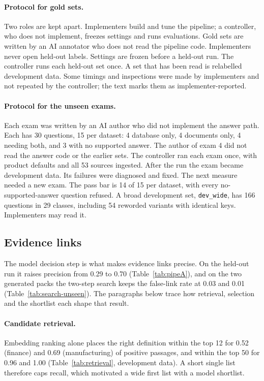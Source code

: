 \documentclass[11pt,a4paper]{article}
\begin{document}
\paragraph{Protocol for gold sets.} Two roles are kept apart. Implementers build and tune the pipeline; a controller, who does not implement, freezes settings and runs evaluations. Gold sets are written by an AI annotator who does not read the pipeline code. Implementers never open held-out labels. Settings are frozen before a held-out run. The controller runs each held-out set once. A set that has been read is relabelled development data. Some timings and inspections were made by implementers and not repeated by the controller; the text marks them as implementer-reported.

\paragraph{Protocol for the unseen exams.}\label{sec:exam-protocol}
Each exam was written by an AI author who did not implement the answer path. Each has 30 questions, 15 per dataset: 4 database only, 4 documents only, 4 needing both, and 3 with no supported answer. The author of exam 4 did not read the answer code or the earlier sets. The controller ran each exam once, with product defaults and all 53 sources ingested. After the run the exam became development data. Its failures were diagnosed and fixed. The next measure needed a new exam. %
The pass bar is 14 of 15 per dataset, with every no-supported-answer question refused. %
A broad development set, \texttt{dev\_wide}, has 166 questions in 29 classes, including 54 reworded variants with identical keys. Implementers may read it. %

\subsection{Evidence links}\label{sec:res-retrieval}
The model decision step is what makes evidence links precise. On the held-out run it raises precision from 0.29 to 0.70 (Table~\ref{tab:pipeA}), and on the two generated packs the two-step search keeps the false-link rate at 0.03 and 0.01 (Table~\ref{tab:search-unseen}). The paragraphs below trace how retrieval, selection and the shortlist each shape that result.

\paragraph{Candidate retrieval.} Embedding ranking alone places the right definition within the top 12 for 0.52 (finance) and 0.69 (manufacturing) of positive passages, and within the top 50 for 0.96 and 1.00 (Table~\ref{tab:retrieval}, development data). A short single list therefore caps recall, which motivated a wide first list with a model shortlist.
\end{document}
